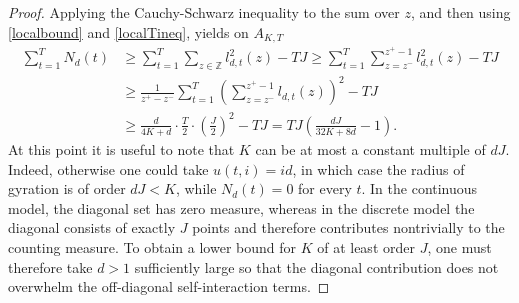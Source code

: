 \documentclass[10pt,a4paper]{amsart}
\newcommand{\Z}{\mathbb{Z}}
\begin{document}
\begin{proof}
Applying the Cauchy-Schwarz inequality to the sum over $z$, and then using \eqref{localbound} and \eqref{localTineq}, yields on $A_{K,T}$
\begin{equation}
\begin{split}
\label{QmeasB}
\sum_{t=1}^{T}N_d(t)&\geq\sum_{t=1}^{T}\sum_{z\in\Z}l^2_{d,t}(z)-TJ\geq\sum_{t=1}^{T}\sum_{z=z^-}^{z^+-1}l^2_{d,t}(z)-TJ\\
    &\geq \frac{1}{z^+-z^-}\sum_{t=1}^{T}\left(\sum_{z=z^-}^{z^+-1}l_{d,t}(z)\right)^2-TJ\\
    &\geq \frac{d}{4K+d}\cdot\frac{T}{2}\cdot\left(\frac{J}{2}\right)^2-TJ = TJ\left(\frac{d J}{32K+8d}-1\right).
    \end{split}
\end{equation}
At this point it is useful to note that $K$ can be at most a constant multiple of $dJ$. Indeed, otherwise one could take $u(t,i)=id$, in which case the radius of gyration is of order $dJ<K$, while $N_d(t)=0$ for every $t$. In the continuous model, the diagonal set has zero measure, whereas in the discrete model the diagonal consists of exactly $J$ points and therefore contributes nontrivially to the counting measure. To obtain a lower bound for $K$ of at least order $J$, one must therefore take $d>1$ sufficiently large so that the diagonal contribution does not overwhelm the off-diagonal self-interaction terms.


\end{proof}
\end{document}
